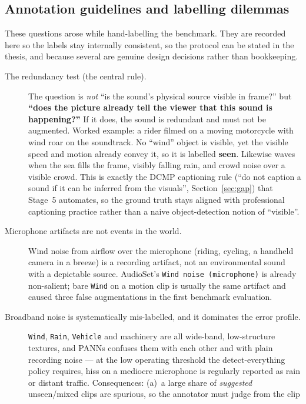 \documentclass[11pt,a4paper]{article}
\begin{document}
\subsection{Annotation guidelines and labelling dilemmas}\label{sec:annotation}
These questions arose while hand-labelling the benchmark. They are recorded here so the labels
stay internally consistent, so the protocol can be stated in the thesis, and because several are
genuine design decisions rather than bookkeeping.

\begin{description}
  \item[The redundancy test (the central rule).] The question is \emph{not} ``is the sound's
    physical source visible in frame?'' but \textbf{``does the picture already tell the viewer
    that this sound is happening?''} If it does, the sound is redundant and must not be
    augmented. Worked example: a rider filmed on a moving motorcycle with wind roar on the
    soundtrack. No ``wind'' object is visible, yet the visible speed and motion already convey
    it, so it is labelled \textbf{seen}. Likewise waves when the sea fills the frame, visibly
    falling rain, and crowd noise over a visible crowd. This is exactly the DCMP captioning rule
    (``do not caption a sound if it can be inferred from the visuals'', Section~\ref{sec:gap})
    that Stage~5 automates, so the ground truth stays aligned with professional captioning
    practice rather than a naive object-detection notion of ``visible''.
  \item[Microphone artifacts are not events in the world.] Wind noise from airflow over the
    microphone (riding, cycling, a handheld camera in a breeze) is a recording artifact, not an
    environmental sound with a depictable source. AudioSet's \texttt{Wind noise (microphone)} is
    already non-salient; bare \texttt{Wind} on a motion clip is usually the same artifact and
    caused three false augmentations in the first benchmark evaluation.
  \item[Broadband noise is systematically mis-labelled, and it dominates the error profile.]
    \texttt{Wind}, \texttt{Rain}, \texttt{Vehicle} and machinery are all wide-band, low-structure
    textures, and PANNs confuses them with each other and with plain recording noise --- at the
    low operating threshold the detect-everything policy requires, hiss on a mediocre microphone
    is regularly reported as rain or distant traffic. Consequences: (a)~a large share of
    \emph{suggested} unseen/mixed clips are spurious, so the annotator must judge from the clip

\end{description}
\end{document}
